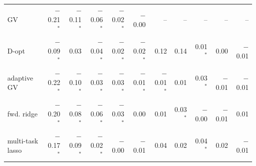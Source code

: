 \begin{tabular}{lrrrrrrrrrr}
GV & $-$0.21$^*$ & $-$0.11$^*$ & $-$0.06$^*$ & $-$0.02$^*$ & $-$0.00 & -- & -- & -- & -- & -- \\
D-opt & $-$0.09$^*$ & 0.03 & $-$0.04$^*$ & $-$0.02$^*$ & $-$0.02$^*$ & 0.12 & 0.14 & 0.01$^*$ & 0.00 & $-$0.01 \\
adaptive GV & $-$0.22$^*$ & $-$0.10$^*$ & $-$0.03$^*$ & $-$0.03$^*$ & $-$0.01$^*$ & $-$0.01$^*$ & 0.01 & 0.03$^*$ & $-$0.01 & $-$0.01 \\
fwd. ridge & $-$0.20$^*$ & $-$0.08$^*$ & $-$0.06$^*$ & $-$0.03$^*$ & 0.00 & 0.01 & 0.03$^*$ & $-$0.00 & $-$0.01 & 0.01 \\
multi-task lasso & $-$0.17$^*$ & $-$0.09$^*$ & $-$0.02$^*$ & $-$0.00 & $-$0.01 & 0.04 & 0.02 & 0.04$^*$ & 0.02 & $-$0.01 \\
\bottomrule
\end{tabular}
